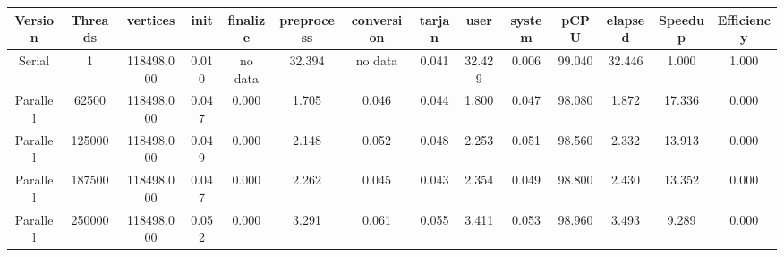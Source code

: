 \begin{tabular}{|c|c|c|c|c|c|c|c|c|c|c|c|c|c|}
\toprule
 Version &  Threads &   vertices &  init & finalize &  preprocess & conversion &  tarjan &   user &  system &   pCPU &  elapsed &  Speedup &  Efficiency \\
\midrule
  Serial &        1 & 118498.000 & 0.010 &  no data &      32.394 &    no data &   0.041 & 32.429 &   0.006 & 99.040 &   32.446 &    1.000 &       1.000 \\
Parallel &    62500 & 118498.000 & 0.047 &    0.000 &       1.705 &      0.046 &   0.044 &  1.800 &   0.047 & 98.080 &    1.872 &   17.336 &       0.000 \\
Parallel &   125000 & 118498.000 & 0.049 &    0.000 &       2.148 &      0.052 &   0.048 &  2.253 &   0.051 & 98.560 &    2.332 &   13.913 &       0.000 \\
Parallel &   187500 & 118498.000 & 0.047 &    0.000 &       2.262 &      0.045 &   0.043 &  2.354 &   0.049 & 98.800 &    2.430 &   13.352 &       0.000 \\
Parallel &   250000 & 118498.000 & 0.052 &    0.000 &       3.291 &      0.061 &   0.055 &  3.411 &   0.053 & 98.960 &    3.493 &    9.289 &       0.000 \\
\bottomrule
\end{tabular}
